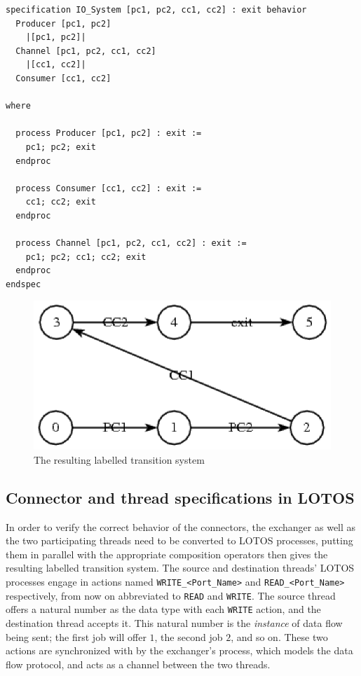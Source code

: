 \begin{minipage}{\listingwidth}
\lstset{language=lotos}
\begin{lstlisting}[label=lst:lotos_ex, caption=An example of a LOTOS
    specification]
specification IO_System [pc1, pc2, cc1, cc2] : exit behavior
  Producer [pc1, pc2]
    |[pc1, pc2]|
  Channel [pc1, pc2, cc1, cc2]
    |[cc1, cc2]|
  Consumer [cc1, cc2]

where

  process Producer [pc1, pc2] : exit :=
    pc1; pc2; exit
  endproc

  process Consumer [cc1, cc2] : exit :=
    cc1; cc2; exit
  endproc

  process Channel [pc1, pc2, cc1, cc2] : exit :=
    pc1; pc2; cc1; cc2; exit
  endproc
endspec
\end{lstlisting}
\end{minipage}

\begin{figure}
\centering
\includegraphics[scale=1]{figs/ex1}
\caption{The resulting labelled transition system}
\label{fig:lotos_ex}
\end{figure}

\subsection{Connector and thread specifications in LOTOS}
In order to verify the correct behavior of the connectors, the
exchanger as well as the two participating threads need to be
converted to LOTOS processes, putting them in parallel with the
appropriate composition operators then gives the resulting labelled
transition system. The source and destination threads' LOTOS processes
engage in actions named \texttt{WRITE\_<Port\_Name>} and
\texttt{READ\_<Port\_Name>} respectively, from now on abbreviated to
\texttt{READ} and \texttt{WRITE}. The source thread offers a natural
number as the data type with each \texttt{WRITE} action, and the
destination thread accepts it. This natural number is the
\emph{instance} of data flow being sent; the first job will offer $1$,
the second job $2$, and so on. These two actions are synchronized with
by the exchanger's process, which models the data flow protocol, and
acts as a channel between the two threads.

